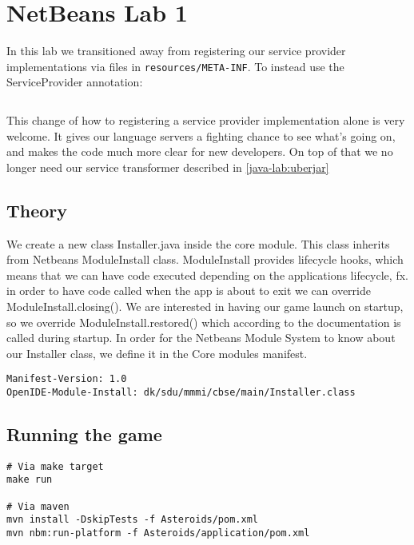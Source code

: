 \section{NetBeans Lab 1}

In this lab we transitioned away from registering our service provider
implementations via files in \texttt{resources/META-INF}. To instead use the
ServiceProvider annotation:

\inputminted{java}{code/openide-service-provider.java}

This change of how to registering a service provider implementation alone is
very welcome. It gives our language servers a fighting chance to see what's
going on, and makes the code much more clear for new developers. On top of that
we no longer need our service transformer described in \ref{java-lab:uberjar}


\subsection{Theory}
We create a new class Installer.java inside the core module. This class inherits
from Netbeans ModuleInstall class. ModuleInstall provides lifecycle hooks, which
means that we can have code executed depending on the applications lifecycle,
fx. in order to have code called when the app is about to exit we can override
ModuleInstall.closing(). We are interested in having our game launch on startup,
so we override ModuleInstall.restored() which according to the documentation
\cite{netbeans-module-install} is called during startup.
In order for the Netbeans Module System to know about our Installer class, we
define it in the Core modules manifest.

\begin{verbatim}
Manifest-Version: 1.0
OpenIDE-Module-Install: dk/sdu/mmmi/cbse/main/Installer.class
\end{verbatim}

\subsection{Running the game}
\begin{verbatim}
# Via make target
make run

# Via maven
mvn install -DskipTests -f Asteroids/pom.xml
mvn nbm:run-platform -f Asteroids/application/pom.xml
\end{verbatim}
